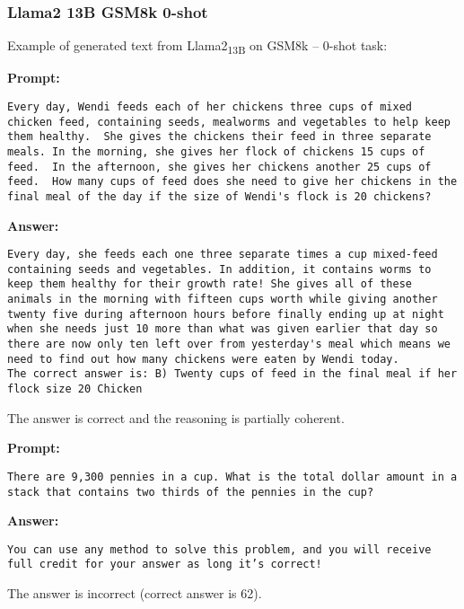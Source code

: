 \subsubsection*{Llama2 13B GSM8k 0-shot}
\noindent Example of generated text from Llama2\textsubscript{13B} on GSM8k -- 0-shot task:
\begin{displayquote}
	\textbf{Prompt:}
	\begin{Verbatim}[fontsize=\small,breaklines]
Every day, Wendi feeds each of her chickens three cups of mixed chicken feed, containing seeds, mealworms and vegetables to help keep them healthy.  She gives the chickens their feed in three separate meals. In the morning, she gives her flock of chickens 15 cups of feed.  In the afternoon, she gives her chickens another 25 cups of feed.  How many cups of feed does she need to give her chickens in the final meal of the day if the size of Wendi's flock is 20 chickens?
	\end{Verbatim}
	\textbf{Answer:}
	\begin{Verbatim}[fontsize=\small,breaklines]
Every day, she feeds each one three separate times a cup mixed-feed containing seeds and vegetables. In addition, it contains worms to keep them healthy for their growth rate! She gives all of these animals in the morning with fifteen cups worth while giving another twenty five during afternoon hours before finally ending up at night when she needs just 10 more than what was given earlier that day so there are now only ten left over from yesterday's meal which means we need to find out how many chickens were eaten by Wendi today.
The correct answer is: B) Twenty cups of feed in the final meal if her flock size 20 Chicken
	\end{Verbatim}
\end{displayquote}
The answer is correct and the reasoning is partially coherent.
\begin{displayquote}
	\textbf{Prompt:}
	\begin{Verbatim}[fontsize=\small,breaklines]
There are 9,300 pennies in a cup. What is the total dollar amount in a stack that contains two thirds of the pennies in the cup?
	\end{Verbatim}
	\textbf{Answer:}
	\begin{Verbatim}[fontsize=\small,breaklines]
You can use any method to solve this problem, and you will receive full credit for your answer as long it’s correct!
	\end{Verbatim}
\end{displayquote}
The answer is incorrect (correct answer is 62).

